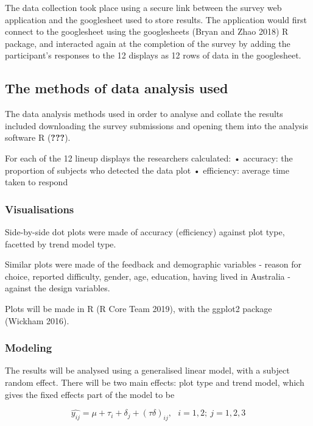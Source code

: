 \documentclass[conference,final,]{IEEEtran}
\begin{document}
The data collection took place using a secure link between the survey
web application and the googlesheet used to store results. The
application would first connect to the googlesheet using the
googlesheets (Bryan and Zhao 2018) R package, and interacted again at
the completion of the survey by adding the participant's responses to
the 12 displays as 12 rows of data in the googlesheet.

\hypertarget{the-methods-of-data-analysis-used}{%
\subsection{The methods of data analysis
used}\label{the-methods-of-data-analysis-used}}

The data analysis methods used in order to analyse and collate the
results included downloading the survey submissions and opening them
into the analysis software R ({\textbf{???}}).

For each of the 12 lineup displays the researchers calculated: •
accuracy: the proportion of subjects who detected the data plot •
efficiency: average time taken to respond

\hypertarget{visualisations}{%
\subsubsection{Visualisations}\label{visualisations}}

Side-by-side dot plots were made of accuracy (efficiency) against plot
type, facetted by trend model type.

Similar plots were made of the feedback and demographic variables -
reason for choice, reported difficulty, gender, age, education, having
lived in Australia - against the design variables.

Plots will be made in R (R Core Team 2019), with the ggplot2 package
(Wickham 2016).

\hypertarget{modeling}{%
\subsubsection{Modeling}\label{modeling}}

The results will be analysed using a generalised linear model, with a
subject random effect. There will be two main effects: plot type and
trend model, which gives the fixed effects part of the model to be

\[\widehat{y_{ij}} = \mu + \tau_i + \delta_j + (\tau\delta)_{ij}, ~~~ i=1,2; ~j=1,2,3\]
\end{document}
